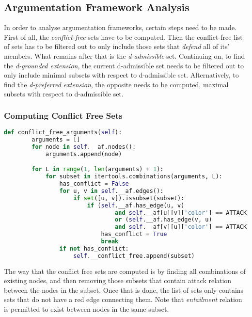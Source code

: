     \subsection{Argumentation Framework Analysis} \label{bapanalysis}
    
        In order to analyse argumentation frameworks, certain steps need to be made. First of all, the \textit{conflict-free} sets have to be computed. Then the conflict-free list of sets has to be filtered out to only include those sets that \textit{defend} all of its' members. What remains after that is the \textit{d-admissible} set. Continuing on, to find the \textit{d-grounded extension}, the current d-admissible set needs to be filtered out to only include minimal subsets with respect to d-admissible set. Alternatively, to find the \textit{d-preferred extension}, the opposite needs to be computed, maximal subsets with respect to d-admissible set.
        
        \subsubsection{Computing Conflict Free Sets}
        
            \begin{lstlisting}[language=Python, caption=Conflict Free Arguments, label=code:conflictfree]
    def conflict_free_arguments(self):
        arguments = []
        for node in self.__af.nodes():
            arguments.append(node)

        for L in range(1, len(arguments) + 1):
            for subset in itertools.combinations(arguments, L):
                has_conflict = False
                for u, v in self.__af.edges():
                    if set([u, v]).issubset(subset):
                        if (self.__af.has_edge(u, v)
                                and self.__af[u][v]['color'] == ATTACK)
                                or (self.__af.has_edge(v, u)
                                and self.__af[v][u]['color'] == ATTACK):
                            has_conflict = True
                            break
                if not has_conflict:
                    self.__conflict_free.append(subset)
            \end{lstlisting}
            
            The way that the conflict free sets are computed is by finding all combinations of existing nodes, and then removing those subsets that contain attack relation between the nodes in the subset. Once that is done, the list of sets only contains sets that do not have a red edge connecting them. Note that \textit{entailment} relation is permitted to exist between nodes in the same subset.
            
